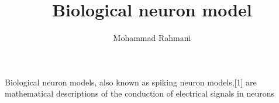 \documentclass[a4paper]{article}
\title{Biological neuron model}
\date{}
\author{Mohammad Rahmani}
\begin{document}
    \maketitle
    Biological neuron models, also known as spiking neuron models,[1] are mathematical descriptions of the conduction of electrical signals in neurons 
    
    
\end{document}
